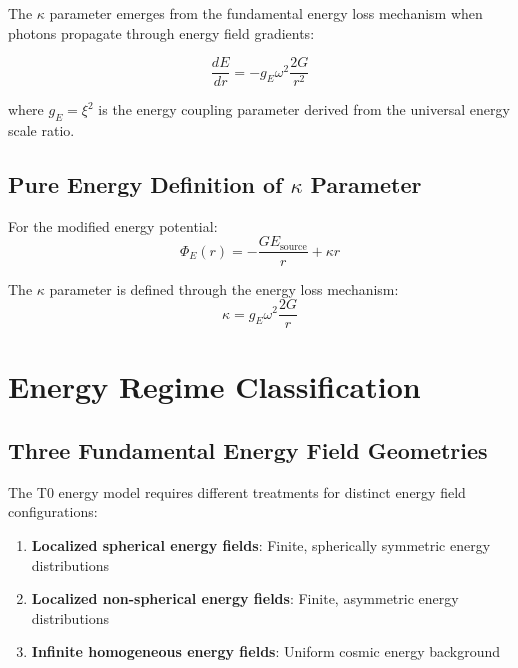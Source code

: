 \documentclass[12pt,a4paper]{article}
\newcommand{\kappaparam}{\kappa}
\begin{document}
	The $\kappa$ parameter emerges from the fundamental energy loss mechanism when photons propagate through energy field gradients:
	
	\begin{equation}
		\boxed{\frac{dE}{dr} = -g_E \omega^2 \frac{2G}{r^2}}
		\label{eq:energy_loss_rate_energy}
	\end{equation}
	
	where $g_E = \xi^2$ is the energy coupling parameter derived from the universal energy scale ratio.
	
	\subsection{Pure Energy Definition of $\kappa$ Parameter}
	
	For the modified energy potential:
	\begin{equation}
		\boxed{\Phi_E(r) = -\frac{G E_{\text{source}}}{r} + \kappaparam r}
		\label{eq:modified_energy_potential}
	\end{equation}
	
	The $\kappa$ parameter is defined through the energy loss mechanism:
	\begin{equation}
		\boxed{\kappaparam = g_E \omega^2 \frac{2G}{r}}
		\label{eq:kappa_energy_definition}
	\end{equation}
	
	\section{Energy Regime Classification}
	
	\subsection{Three Fundamental Energy Field Geometries}
	
	The T0 energy model requires different treatments for distinct energy field configurations:
	
	\begin{enumerate}
		\item \textbf{Localized spherical energy fields}: Finite, spherically symmetric energy distributions
		\item \textbf{Localized non-spherical energy fields}: Finite, asymmetric energy distributions  
		\item \textbf{Infinite homogeneous energy fields}: Uniform cosmic energy background
	\end{enumerate}
	
\end{document}

